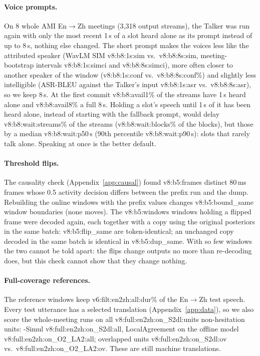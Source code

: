 \paragraph{Voice prompts.} On 8 whole AMI En$\rightarrow$Zh meetings (3{,}318 output
streams), the Talker was run again with only the most recent 1\,s of a slot heard alone as its prompt instead of up to
8\,s, nothing else changed. The short prompt makes the voices less like the attributed speaker (WavLM SIM
\num{v8:b8:1s:sim} vs.\ \num{v8:b8:8s:sim}, meeting-bootstrap intervals \num{v8:b8:1s:simci} and \num{v8:b8:8s:simci}),
more often closer to another speaker of the window (\num{v8:b8:1s:conf} vs.\ \num{v8:b8:8s:conf}\%) and slightly less
intelligible (ASR-BLEU against the Talker's input \num{v8:b8:1s:asr} vs.\ \num{v8:b8:8s:asr}), so we keep 8\,s. At the
first commit \num{v8:b8:avail1}\% of the streams have 1\,s heard alone and \num{v8:b8:avail8}\% a full 8\,s. Holding a
slot's speech until 1\,s of it has been heard alone, instead of starting with the fallback prompt, would delay
\num{v8:b8:wait:streams}\% of the streams (\num{v8:b8:wait:blocks}\% of the blocks), but those by a median
\num{v8:b8:wait:p50}\,s (90th percentile \num{v8:b8:wait:p90}\,s): slots that rarely talk alone. Speaking at once is the
better default.

\paragraph{Threshold flips.} The causality check (Appendix~\ref{app:causal}) found \num{v8:b5:frames} distinct
80\,ms frames whose 0.5 activity decision differs between the prefix run and the dump. Rebuilding the online windows
with the prefix values changes \num{v8:b5:bound_same} window boundaries (none moves). The \num{v8:b5:windows} windows
holding a flipped frame were decoded again, each together with a copy using the original posteriors in the same batch:
\num{v8:b5:flip_same} are token-identical; an unchanged copy decoded in the same batch is identical in
\num{v8:b5:dup_same}. With so few windows the two cannot be told apart: the flips change outputs no more than
re-decoding does, but this check cannot show that they change nothing.

\paragraph{Full-coverage references.} The reference windows keep \num{v6:filt:en2zh:all:dur}\% of the En$\rightarrow$Zh
test speech. Every test utterance has a selected translation (Appendix~\ref{app:data}), so we also score the whole-meeting
runs on all \num{v8:full:en2zh:on_S2dl:units} non-hesitation units: \sys{}-Simul \num{v8:full:en2zh:on_S2dl:all}, LocalAgreement
on the offline model \num{v8:full:en2zh:on_O2_LA2:all}; overlapped units \num{v8:full:en2zh:on_S2dl:ov} vs.\
\num{v8:full:en2zh:on_O2_LA2:ov}. These are still machine translations.

